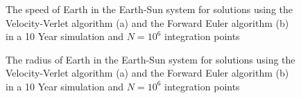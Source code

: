 \documentclass[10pt,showpacs,preprintnumbers,amsmath,amssymb,nofootinbib,aps,prl,twocolumn,groupedaddress,superscriptaddress,showkeys]{revtex4-1}
\begin{document}
\begin{figure}
  \center
   \caption{The speed of Earth in the Earth-Sun system for solutions using the Velocity-Verlet algorithm (a) and the Forward Euler algorithm (b) in a 10 Year simulation and $N=10^6$ integration points}
   \label{fig:c_speed}
\end{figure}
\begin{figure}
  \center
   \caption{The radius of Earth in the Earth-Sun system for solutions using the Velocity-Verlet algorithm (a) and the Forward Euler algorithm (b) in a 10 Year simulation and $N=10^6$ integration points}
   \label{fig:c_radius}
\end{figure}
\newpage
\end{document}
